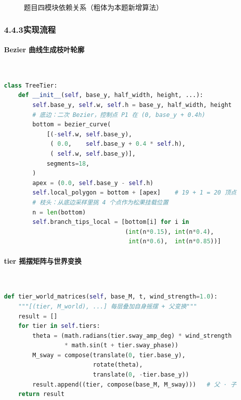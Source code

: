 \documentclass[12pt, a4paper]{article}
\begin{document}
\begin{figure}[H]
\centering
{}
\caption{题目四模块依赖关系（粗体为本题新增算法）}
\label{fig:module-tree}
\end{figure}

\subsubsection*{4.4.3\quad 实现流程}

\paragraph{Bezier 曲线生成枝叶轮廓}~

\begin{lstlisting}[language=Python, caption={tier 静态轮廓（tree.py 摘录）}]
class TreeTier:
    def __init__(self, base_y, half_width, height, ...):
        self.base_y, self.w, self.h = base_y, half_width, height
        # 底边：二次 Bezier，控制点 P1 在 (0, base_y + 0.4h)
        bottom = bezier_curve(
            [(-self.w, self.base_y),
             ( 0.0,    self.base_y + 0.4 * self.h),
             ( self.w, self.base_y)],
            segments=18,
        )
        apex = (0.0, self.base_y - self.h)
        self.local_polygon = bottom + [apex]    # 19 + 1 = 20 顶点
        # 枝头：从底边采样里挑 4 个点作为松果挂载位置
        n = len(bottom)
        self.branch_tips_local = [bottom[i] for i in
                                  (int(n*0.15), int(n*0.4),
                                   int(n*0.6),  int(n*0.85))]
\end{lstlisting}

\paragraph{tier 摇摆矩阵与世界变换}~

\begin{lstlisting}[language=Python, caption={层级化变换（tree.py 摘录）}]
def tier_world_matrices(self, base_M, t, wind_strength=1.0):
    """[(tier, M_world), ...] 每层叠加自身摇摆 + 父变换"""
    result = []
    for tier in self.tiers:
        theta = (math.radians(tier.sway_amp_deg) * wind_strength
                 * math.sin(t + tier.sway_phase))
        M_sway = compose(translate(0, tier.base_y),
                         rotate(theta),
                         translate(0, -tier.base_y))
        result.append((tier, compose(base_M, M_sway)))   # 父 ⋅ 子
    return result
\end{lstlisting}
\end{document}

